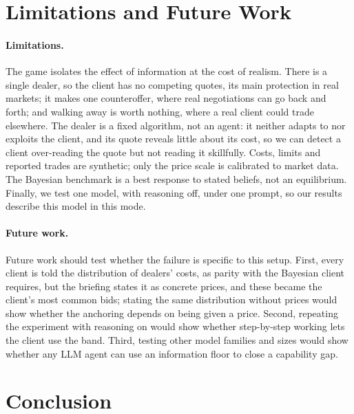\documentclass[sigconf]{acmart}
\begin{document}
\section{Limitations and Future Work}

\paragraph{Limitations.}
The game isolates the effect of information at the cost of realism. There is a single dealer, so the client has no competing quotes, its main protection in real markets; it makes one counteroffer, where real negotiations can go back and forth; and walking away is worth nothing, where a real client could trade elsewhere. The dealer is a fixed algorithm, not an agent: it neither adapts to nor exploits the client, and its quote reveals little about its cost, so we can detect a client over-reading the quote but not reading it skillfully. Costs, limits and reported trades are synthetic; only the price scale is calibrated to market data. The Bayesian benchmark is a best response to stated beliefs, not an equilibrium. Finally, we test one model, with reasoning off, under one prompt, so our results describe this model in this mode.

\paragraph{Future work.}
Future work should test whether the failure is specific to this setup. First, every client is told the distribution of dealers' costs, as parity with the Bayesian client requires, but the briefing states it as concrete prices, and these became the client's most common bids; stating the same distribution without prices would show whether the anchoring depends on being given a price. Second, repeating the experiment with reasoning on would show whether step-by-step working lets the client use the band. Third, testing other model families and sizes would show whether any LLM agent can use an information floor to close a capability gap.



\section{Conclusion}
\end{document}
